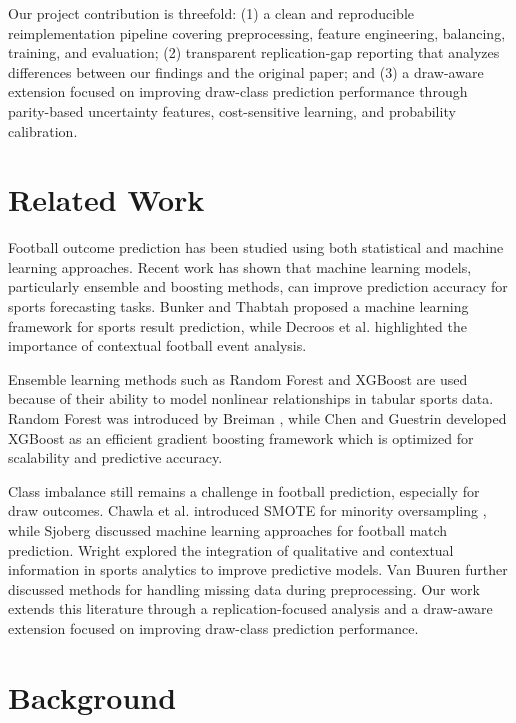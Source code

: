 \documentclass[11pt]{article}
\begin{document}
Our project contribution is threefold: (1) a clean and reproducible reimplementation pipeline covering preprocessing, feature engineering, balancing, training, and evaluation; (2) transparent replication-gap reporting that analyzes differences between our findings and the original paper; and (3) a draw-aware extension focused on improving draw-class prediction performance through parity-based uncertainty features, cost-sensitive learning, and probability calibration.


\section{Related Work}

Football outcome prediction has been studied using both statistical and machine learning approaches. Recent work has shown that machine learning models, particularly ensemble and boosting methods, can improve prediction accuracy for sports forecasting tasks. Bunker and Thabtah \cite{bunker2019sport} proposed a machine learning framework for sports result prediction, while Decroos et al. \cite{decroos2019actions} highlighted the importance of contextual football event analysis. 

Ensemble learning methods such as Random Forest and XGBoost are used because of their ability to model nonlinear relationships in tabular sports data. Random Forest was introduced by Breiman \cite{breiman2001random}, while Chen and Guestrin \cite{chen2016xgboost} developed XGBoost as an efficient gradient boosting framework which is optimized for scalability and predictive accuracy.

Class imbalance still remains a challenge in football prediction, especially for draw outcomes. Chawla et al. introduced SMOTE for minority oversampling \cite{chawla2002smote}, while Sjoberg \cite{sjoberg2023match} discussed machine learning approaches for football match prediction. Wright \cite{wright2020} explored the integration of qualitative and contextual information in sports analytics to improve predictive models. Van Buuren \cite{vanbuuren2018flexible} further discussed methods for handling missing data during preprocessing. Our work extends this literature through a replication-focused analysis and a draw-aware extension focused on improving draw-class prediction performance.

\section{Background}
\end{document}
